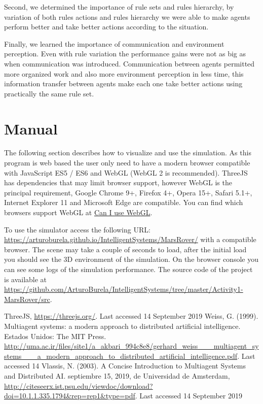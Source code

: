 \documentclass[runningheads]{llncs}
\begin{document}
Second, we determined the importance of rule sets and rules hierarchy, by variation of both rules actions and rules hierarchy we were able to make agents perform better and take better actions according to the situation.

Finally, we learned the importance of communication and environment perception. Even with rule variation the performance gains were not as big as when communication was introduced. Communication between agents permitted more organized work and also more environment perception in less time, this information transfer between agents make each one take better actions using practically the same rule set.

\section{Manual}
The following section describes how to visualize and use the simulation. As this program is web based the user only need to have a modern browser compatible with JavaScript ES5 / ES6 and WebGL (WebGL 2 is recommended).
ThreeJS has dependencies that may limit browser support, however WebGL is the principal requirement, Google Chrome 9+, Firefox 4+, Opera 15+, Safari 5.1+, Internet Explorer 11 and Microsoft Edge are compatible. You can find which browsers support WebGL at \href{https://caniuse.com/\#feat=webgl}{Can I use WebGL}.

To use the simulator access the following URL: \url{https://arturoburela.github.io/IntelligentSystems/MarsRover/} with a compatible browser. The scene may take a couple of seconds to load, after the initial load you should see the 3D environment of the simulation. On the browser console you can see some logs of the simulation performance. The source code of the project is available at \url{https://github.com/ArturoBurela/IntelligentSystems/tree/master/Activity1-MarsRover/src}.
%
%
%
% 
% 
%
\begin{thebibliography}{8}

ThreeJS, \url{https://threejs.org/}. Last accessed 14
September 2019
Weiss, G. (1999). Multiagent systems: a modern approach to distributed artificial intelligence. Estados Unidos: The MIT Press.
\url{http://uma.ac.ir/files/site1/a_akbari_994c8e8/gerhard_weiss___multiagent_systems___a_modern_approach_to_distributed_artificial_intelligence.pdf}. Last accessed 14
Vlassis, N. (2003). A Concise Introduction to Multiagent Systems and Distributed AI. septiembre 15, 2019, de Universidad de Amsterdam, \url{http://citeseerx.ist.psu.edu/viewdoc/download?doi=10.1.1.335.1794&rep=rep1&type=pdf}. Last accessed 14
September 2019
\end{thebibliography}
\end{document}
